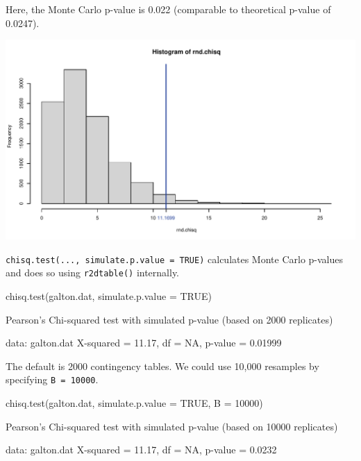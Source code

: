 \documentclass[a4paper]{article}\usepackage[]{graphicx}\usepackage[]{xcolor}
\makeatletter
\def\maxwidth{ %
  \ifdim\Gin@nat@width>\linewidth
    \linewidth
  \else
    \Gin@nat@width
  \fi
}
\makeatother
\begin{document}
Here, the Monte Carlo p-value is 0.022 (comparable to theoretical p-value of 0.0247).
\begin{Schunk}


{\centering \includegraphics[width=\maxwidth]{figure/listings-unnamed-chunk-54-1} 

}

\end{Schunk}
\lstinline|chisq.test(..., simulate.p.value = TRUE)| calculates Monte Carlo p-values and does so using \lstinline|r2dtable()| internally.
\begin{Schunk}
\begin{Sinput}
chisq.test(galton.dat, simulate.p.value = TRUE)
\end{Sinput}
\begin{Soutput}

	Pearson's Chi-squared test with simulated p-value (based on 2000
	replicates)

data:  galton.dat
X-squared = 11.17, df = NA, p-value = 0.01999
\end{Soutput}
\end{Schunk}
The default is 2000 contingency tables. We could use 10,000 resamples by specifying \lstinline|B = 10000|.
\begin{Schunk}
\begin{Sinput}
chisq.test(galton.dat, simulate.p.value = TRUE, B = 10000)
\end{Sinput}
\begin{Soutput}

	Pearson's Chi-squared test with simulated p-value (based on 10000
	replicates)

data:  galton.dat
X-squared = 11.17, df = NA, p-value = 0.0232
\end{Soutput}
\end{Schunk}
\end{document}

